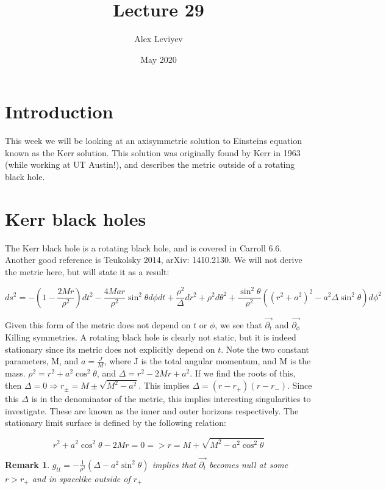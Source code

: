 \documentclass{article}
\title{Lecture 29}
\author{Alex Leviyev}
\date{May 2020}
\newtheorem*{remark}{Remark}
\theoremstyle{definition}
\theoremstyle{remark}
\begin{document}
\maketitle

\section{Introduction}
This week we will be looking at an axisymmetric solution to Einsteins equation known as the Kerr solution. This solution was originally found by Kerr in 1963 (while working at UT Austin!), and describes the metric outside of a rotating black hole. 


\section{Kerr black holes}
The Kerr black hole is a rotating black hole, and is covered in Carroll 6.6. Another good reference is Teukolsky 2014, arXiv: 1410.2130. We will not derive the metric here, but will state it as a result:

\begin{equation}
    ds^2 = -(1 - \frac{2 M r}{\rho^2}) dt^2 - \frac{4 M a r}{\rho^2} \sin^2 \theta d \phi dt + \frac{\rho^2}{\Delta} dr^2 + \rho^2 d\theta^2 + \frac{\sin^2 \theta}{\rho^2}((r^2+a^2)^2-a^2 \Delta \sin ^2 \theta) d \phi^2
\end{equation}\label{eq:kerr_metric}

Given this form of the metric does not depend on $t$ or $\phi$, we see that $\Vec{\partial_t}$ and $\Vec{\partial_\phi}$ Killing symmetries. A rotating black hole is clearly not static, but it is indeed stationary since its metric does not explicitly depend on $t$. Note the two constant parameters, M, and $a = \frac{J}{M}$, where J is the total angular momentum, and M is the mass. $\rho^2 = r^2 + a^2 \cos ^2 \theta$, and $\Delta = r^2 - 2Mr+a^2.$ If we find the roots of this, then $\Delta = 0 \Rightarrow r_{\pm} = M \pm \sqrt{M^2 - a^2}$. This implies $\Delta = (r-r_+)(r-r_-)$. Since this $\Delta$ is in the denominator of the metric, this implies interesting singularities to investigate. These are known as the inner and outer horizons respectively. The stationary limit surface is defined by the following relation:

$$
r^2 + a^2 \cos^2 \theta - 2Mr=0 => r=M + \sqrt{M^2 - a^2 \cos^2\theta}
$$


\begin{remark}
$g_{tt} = - \frac{1}{\rho^2}(\Delta - a^2 \sin^2 \theta)$ implies that $\Vec{\partial_t}$ becomes null at some $r > r_+$ and in spacelike outside of $r_+$
\end{remark}
\end{document}
